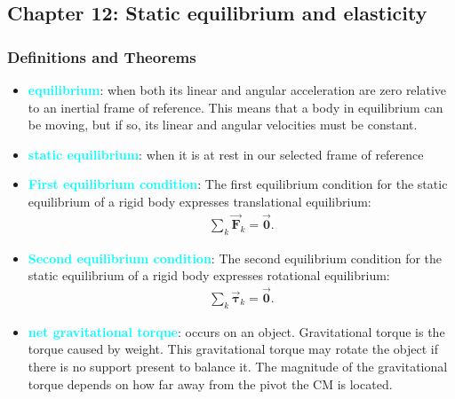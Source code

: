\documentclass{report}
\begin{document}
    \pagebreak 
    \subsection{Chapter 12: Static equilibrium and elasticity}
    \bigbreak \noindent 
    \subsubsection{Definitions and Theorems}
    \begin{itemize}
        \item \textbf{\textcolor{cyan}{equilibrium}}: when both its linear and angular acceleration are zero relative to an inertial frame of reference. This means that a body in equilibrium can be moving, but if so, its linear and angular velocities must be constant.
        \item \textbf{\textcolor{cyan}{static equilibrium}}: when it is at rest in our selected frame of reference
        \item \textbf{\textcolor{cyan}{First equilibrium condition}}:
            The first equilibrium condition for the static equilibrium of a rigid body expresses translational equilibrium:
            \begin{align*}
                \sum_k \vec{\mathbf{F}}_{k} = \vec{\mathbf{0}}
            .\end{align*}
        \item \textbf{\textcolor{cyan}{Second equilibrium condition}}:
            The second equilibrium condition for the static equilibrium of a rigid body expresses rotational equilibrium:
            \begin{align*}
                \sum_k \vec{\mathbf{\tau}}_{k} = \vec{\mathbf{0}}
            .\end{align*}
        \item \textbf{\textcolor{cyan}{net gravitational torque}}: occurs on an object.
            \bigbreak \noindent 
            Gravitational torque is the torque caused by weight. This gravitational torque may rotate the object if there is no support present to balance it. The magnitude of the gravitational torque depends on how far away from the pivot the CM is located.

\end{itemize}
\end{document}
